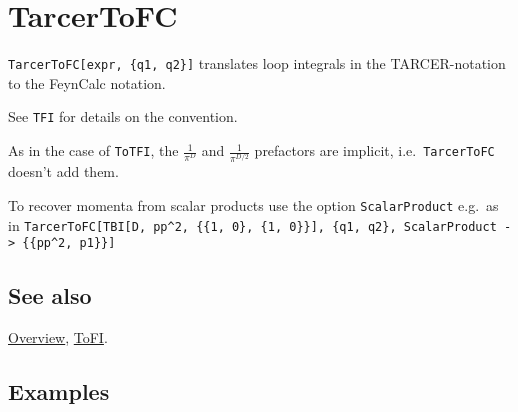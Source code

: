 \documentclass[../FeynCalcManual.tex]{subfiles}
\begin{document}
\hypertarget{tarcertofc}{
\section{TarcerToFC}\label{tarcertofc}}

\texttt{TarcerToFC[\allowbreak{}expr,\ \allowbreak{}\{\allowbreak{}q1,\ \allowbreak{}q2\}]}
translates loop integrals in the TARCER-notation to the FeynCalc
notation.

See \texttt{TFI} for details on the convention.

As in the case of \texttt{ToTFI}, the \(\frac{1}{\pi^D}\) and
\(\frac{1}{\pi^{D/2}}\) prefactors are implicit,
i.e.~\texttt{TarcerToFC} doesn't add them.

To recover momenta from scalar products use the option
\texttt{ScalarProduct} e.g.~as in
\texttt{TarcerToFC[\allowbreak{}TBI[\allowbreak{}D,\ \allowbreak{}pp^2,\ \allowbreak{}\{\allowbreak{}\{\allowbreak{}1,\ \allowbreak{}0\},\ \allowbreak{}\{\allowbreak{}1,\ \allowbreak{}0\}\}],\ \allowbreak{}\{\allowbreak{}q1,\ \allowbreak{}q2\},\ \allowbreak{}ScalarProduct -> \{\allowbreak{}\{\allowbreak{}pp^2,\ \allowbreak{}p1\}\}]}

\subsection{See also}

\hyperlink{toc}{Overview}, \hyperlink{tofi}{ToFI}.

\subsection{Examples}

\begin{Shaded}
\begin{Highlighting}[]
\OperatorTok{[}\OperatorTok{,}\OperatorTok{[}\OperatorTok{[}\OperatorTok{,} \OperatorTok{],}\OperatorTok{[}\OperatorTok{,} \OperatorTok{]],} \OperatorTok{\{}\OperatorTok{,} \OperatorTok{,} \OperatorTok{,} \OperatorTok{,} \OperatorTok{\},} 
  \OperatorTok{\{\{}\OperatorTok{,} \OperatorTok{\},} \OperatorTok{\{}\OperatorTok{,} \OperatorTok{\},} \OperatorTok{\{}\OperatorTok{,} \OperatorTok{\},} \OperatorTok{\{}\OperatorTok{,} \OperatorTok{\},} \OperatorTok{\{}\OperatorTok{,} \OperatorTok{\}\}]}
\end{Highlighting}
\end{Shaded}
\end{document}
